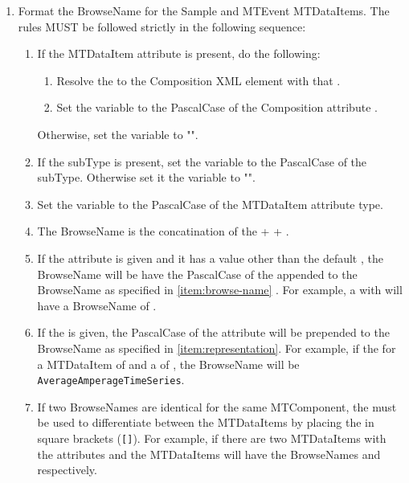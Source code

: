 \begin{enumerate}
  \item Format the \gls{BrowseName} for the \gls{Sample} and \gls{MTEvent} \glspl{MTDataItem}. The rules MUST be followed strictly in the following sequence:
  \begin{enumerate}[after=\vspace{\baselineskip}]
    \setlength\itemsep{1em}
    \item If the \gls{MTDataItem} attribute  is present, do the following:
    \begin{enumerate}
      \item Resolve the  to the \gls{Composition} XML element with that .
      \item Set the variable  to the \gls{PascalCase} of the \gls{Composition} attribute .
    \end{enumerate}
    Otherwise, set the variable  to "".
    \item If the \gls{subType} is present, set the variable  to the \gls{PascalCase} of the \gls{subType}. Otherwise set it the variable  to "".
    \item Set the variable  to the \gls{PascalCase} of the \gls{MTDataItem} attribute \gls{type}.
    \item The \gls{BrowseName} is the concatination of the  +  + . \label{item:browse-name}
    \item If the  attribute is given and it has a value other than the default , the \gls{BrowseName} will be have the \gls{PascalCase} of the  appended to the \gls{BrowseName}  as specified in \ref{item:browse-name} . For example, a  with  will have a \gls{BrowseName} of . \label{item:representation}
    \item If the  is given, the \gls{PascalCase} of the  attribute will be prepended to the \gls{BrowseName}  as specified in \ref{item:representation}. For example, if the  for a \gls{MTDataItem} of  and a  of , the \gls{BrowseName} will be  \texttt{AverageAmperageTimeSeries}. \label{item:statistic}
    \item If two \glspl{BrowseName} are identical for the same \gls{MTComponent}, the  must be used to differentiate between the \glspl{MTDataItem} by placing the  in square brackets (\texttt{[]}). For example, if there are two  \glspl{MTDataItem} with the attributes  and  the \glspl{MTDataItem} will have the \glspl{BrowseName}  and  respectively. \label{item:data-item-name}
  \end{enumerate} 


\end{enumerate}
